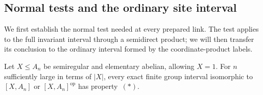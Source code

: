 \subsection{Normal tests and the ordinary site interval}

We first establish the normal test needed at every prepared link.  The
test applies to the full invariant interval through a semidirect product;
we will then transfer its conclusion to the ordinary interval formed by
the coordinate-product labels.

\begin{lemma}\label{r:alternating-normal}
Let $X\le A_n$ be semiregular and elementary abelian, allowing $X=1$.
For $n$ sufficiently large in terms of $|X|$, every exact finite group
interval isomorphic to $[X,A_n]$ or $[X,A_n]^{\mathrm{op}}$ has
property~\((*)\).
\end{lemma}

